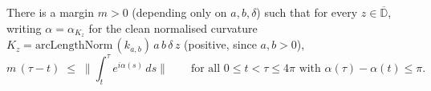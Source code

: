 \begin{lemma}

  \label{lem:clean_chord_margin}
  There is a margin $m>0$ (depending only on $a,b,\delta$) such that for every
  $z\in\overline{\mathbb{D}}$, writing $\alpha=\alpha_{K_z}$ for the clean normalised
  curvature $K_z=\mathrm{arcLengthNorm}\,(k_{a,b})\,a\,b\,\delta\,z$ (positive, since
  $a,b>0$),
  \[
    m\,(\tau-t)\;\le\;\bigl\|\textstyle\int_t^\tau e^{i\alpha(s)}\,ds\bigr\|
    \qquad\text{for all } 0\le t<\tau\le 4\pi \text{ with } \alpha(\tau)-\alpha(t)\le\pi .
  \]
\end{lemma}
